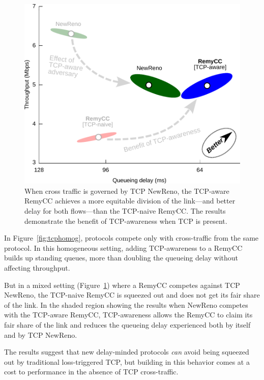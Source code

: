 \begin{figure}
\caption{When cross traffic is governed by TCP NewReno, the TCP-aware
  RemyCC achieves a more equitable division of the link---and better
  delay for both flows---than the TCP-naive RemyCC. The results
  demonstrate the benefit of TCP-awareness when TCP is present.}
\label{fig:tcpheterog}
\begin{center}
\includegraphics[width=\textwidth]{hetero-3.pdf}
\end{center}
\end{figure}

In Figure~\ref{fig:tcphomog}, protocols compete only with
cross-traffic from the same protocol. In this homogeneous setting,
adding TCP-awareness to a RemyCC builds up standing queues, more than
doubling the queueing delay without affecting throughput.

But in a mixed setting (Figure~\ref{fig:tcpheterog}) where a RemyCC
competes against TCP NewReno, the TCP-naive RemyCC is squeezed out and
does not get its fair share of the link. In the shaded region showing
the results when NewReno competes with the TCP-aware RemyCC,
TCP-awareness allows the RemyCC to claim its fair share of the link
and reduces the queueing delay experienced both by itself and by TCP
NewReno.

The results suggest that new delay-minded protocols \emph{can} avoid
being squeezed out by traditional loss-triggered TCP, but building in
this behavior comes at a cost to performance in the absence of TCP
cross-traffic.


